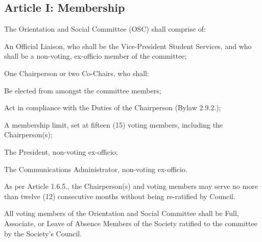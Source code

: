 \subsection{Article I: Membership}
\begin{longenum}[ label*=\thesubsection.\arabic*., align=left] 
	\item The Orientation and Social Committee (OSC) shall comprise of:
		\begin{longenum}[label*=\arabic*., align=left]	
		\item An Official Liaison, who shall be the Vice-President Student Services, and who shall be a non-voting, ex-officio member of the committee;
		\item One Chairperson or two Co-Chairs, who shall:
			\begin{longenum}[label*=\arabic*., align=left]	
			\item Be elected from amongst the committee members;
			\item Act in compliance with the Duties of the Chairperson (Bylaw 2.9.2.);
			\end{longenum}						
		\item A membership limit, set at fifteen (15) voting members, including the Chairperson(s);
		\item The President, non-voting ex-officio;
		\item The Communications Administrator, non-voting ex-officio.		
		\end{longenum}
	\item As per Article 1.6.5., the Chairperson(s) and voting members may serve no more than twelve (12) consecutive months without being re-ratified by Council.
	\item All voting members of the Orientation and Social Committee shall be Full, Associate, or Leave of Absence Members of the Society ratified to the committee by the Society's Council.
\end{longenum}





